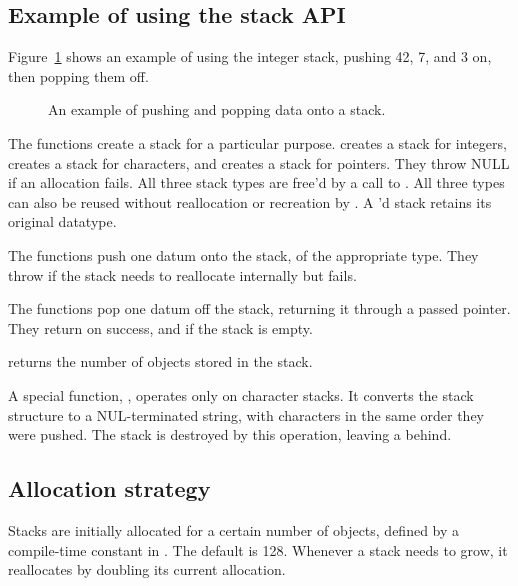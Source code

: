 \subsection{Example of using the stack API}
   
Figure~\ref{fig:stack_example} shows an example of using the integer
stack, pushing 42, 7, and 3 on, then popping them off.

\begin{figure}

\caption{An example of pushing and popping data onto a stack.}
\label{fig:stack_example}
\end{figure}

The  functions create a stack for a particular
purpose.  creates a stack for integers,
 creates a stack for characters, and
 creates a stack for pointers.  They
throw NULL if an allocation fails.  All three stack types are free'd
by a call to . All three types can also
be reused without reallocation or recreation by
. A 'd stack retains its
original datatype.

The  functions push one datum onto the stack, of the
appropriate type. They throw  if the stack needs to
reallocate internally but fails.

The  functions pop one datum off the stack, returning it
through a passed pointer. They return  on success, and
 if the stack is empty.

 returns the number of objects stored
in the stack. 

A special function, , operates
only on character stacks. It converts the stack structure to a
NUL-terminated string, with characters in the same order they were
pushed. The stack is destroyed by this operation, leaving a
 behind.

\subsection{Allocation strategy}

Stacks are initially allocated for a certain number of objects,
defined by a compile-time constant  in
. The default is 128. Whenever a stack needs to grow,
it reallocates by doubling its current allocation.


